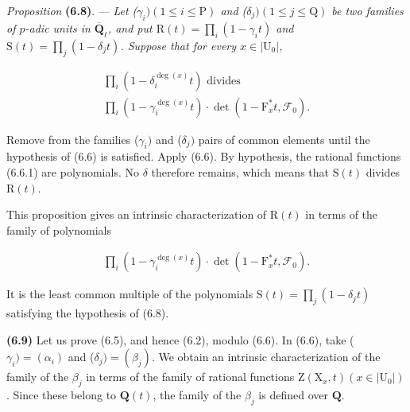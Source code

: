 \documentclass[10pt,leqno]{article}
\begin{document}
\noindent \emph{Proposition} \textbf{(6.8)}. — {\itshape Let (\(\gamma _{i}) (1\leq i\leq \mathrm{P})\) and (\(\delta _{j}) (1\leq j\leq \mathrm{Q})\) be two families of \(p\)-adic units in \(\overline{\mathbf{Q}}_{\ell }\), and put \(\mathrm{R}(t)=\prod _{i}(1- \gamma _{i} t)\) and \(\mathrm{S}(t)=\prod _{j}(1- \delta _{j} t)\). Suppose that for every \(x\in |\mathrm{U}_{0}|\),}\par

\begin{equation*}\begin{gathered}\prod _{i}(1- \delta _{i}^{\operatorname{deg}(x)}t)\text{ divides } \\ \prod _{i}(1- \gamma _{i}^{\operatorname{deg}(x)}t)\cdot \operatorname{det}(1- \mathrm{F}_{x}^{*}t,\mathcal{F} _{0}).\end{gathered}\end{equation*}

\par

\noindent Remove from the families (\(\gamma _{i})\) and (\(\delta _{j})\) pairs of common elements until the hypothesis of (6.6) is satisfied. Apply (6.6). By hypothesis, the rational functions (6.6.1) are polynomials. No \(\delta \) therefore remains, which means that \(\mathrm{S}(t)\) divides \(\mathrm{R}(t)\).\par

\noindent This proposition gives an intrinsic characterization of \(\mathrm{R}(t)\) in terms of the family of polynomials\par

\begin{equation*}\begin{gathered}\prod _{i}(1- \gamma _{i}^{\operatorname{deg}(x)}t)\cdot \operatorname{det}(1- \mathrm{F}_{x}^{*}t,\mathcal{F} _{0}).\end{gathered}\end{equation*}

\noindent It is the least common multiple of the polynomials \(\mathrm{S}(t)=\prod _{j}(1- \delta _{j} t)\) satisfying the hypothesis of (6.8).\par

\noindent \textbf{(6.9)} Let us prove (6.5), and hence (6.2), modulo (6.6). In (6.6), take (\(\gamma _{i})=(\alpha _{i})\) and (\(\delta _{j})=(\beta _{j})\). We obtain an intrinsic characterization of the family of the \(\beta _{j}\) in terms of the family of rational functions \(\mathrm{Z}(\mathrm{X}_{x},t) (x\in |\mathrm{U}_{0}|)\). Since these belong to \(\mathbf{Q}(t)\), the family of the \(\beta _{j}\) is defined over \(\mathbf{Q}\).\par
\end{document}
